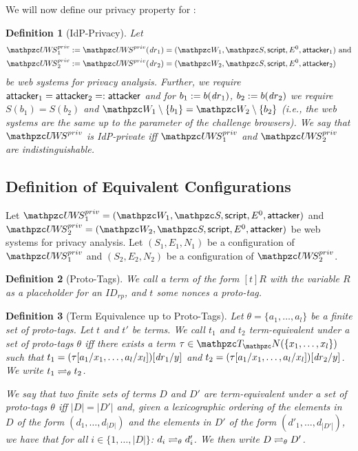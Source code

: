 \documentclass[letterpaper,onecolumn,10pt]{article}
\newtheorem{definition}{Definition}
\begin{document}
We will now define our privacy property for \uppresso:

\begin{definition}[IdP-Privacy]\label{def:idp-privacy}
  Let 
  \begin{align*}
    \uppressoprivwebsystem_1 := \uppressoprivwebsystem(\mi{dr}_1) =
    (\bidsystem_1, \scriptset, \mathsf{script}, E^0, \fAP{attacker}_1)&\text{ and}\\
    \uppressoprivwebsystem_2 := \uppressoprivwebsystem(\mi{dr}_2) =
    (\bidsystem_2, \scriptset, \mathsf{script}, E^0, \fAP{attacker}_2)&
  \end{align*}
  be \uppresso web systems for privacy analysis.  Further, we require
  $\mathsf{attacker}_1 = \mathsf{attacker}_2 =: \mathsf{attacker}$ and for $b_1
  := b(\mathit{dr}_1)$, $b_2 := b(\mathit{dr}_2)$ we require $S(b_1) = S(b_2)$
  and $\bidsystem_1 \setminus \{b_1\} = \bidsystem_2 \setminus
  \{b_2\}$ (i.e., the web systems are the same up to the parameter of
  the challenge browsers).  We say that $\uppressoprivwebsystem$ is
  \emph{IdP-private} iff $\uppressoprivwebsystem_1$ and
  $\uppressoprivwebsystem_2$ are indistinguishable.
\end{definition}

\subsection{Definition of Equivalent Configurations}\label{app:defin-equiv-stat}

Let $\uppressoprivwebsystem_1 = (\bidsystem_1, \scriptset, \mathsf{script}, E^0, \fAP{attacker})$ 
and $\uppressoprivwebsystem_2 = (\bidsystem_2, \scriptset, \mathsf{script}, E^0, \fAP{attacker})$ 
be \uppresso web systems for privacy analysis. Let $(S_1,E_1,N_1)$ 
be a configuration of $\uppressoprivwebsystem_1$ and $(S_2,E_2,N_2)$ 
be a configuration of $\uppressoprivwebsystem_2$.

\begin{definition}[Proto-Tags]
  We call a term of the form $[t]R$ with the variable
  $R$ as a placeholder for an $ID_{rp}$, and $t$ some nonces a
  \emph{proto-tag}.
\end{definition}

\begin{definition}[Term Equivalence up to Proto-Tags]
  Let $\theta = \{a_1, \ldots, a_l \}$ be a finite set of proto-tags.
  Let $t$ and $t'$ be terms. We call $t_1$ and $t_2$
  \emph{term-equivalent under a set of proto-tags $\theta$} iff there
  exists a term $\tau \in \terms(\{x_1,\dots,x_l\})$ such that
  $t_1 = (\tau [ a_1 / x_1 , \dots , a_l / x_l ])[ \mathit{dr}_1 / y ]$
  and
  $t_2 = (\tau [ a_1 / x_1 , \dots , a_l / x_l ])[ \mathit{dr}_2 / y ]$.
  We write $t_1 \rightleftharpoons_{\theta} t_2$.

  We say that two finite sets of terms $D$ and $D'$ are
  \emph{term-equivalent under a set of proto-tags $\theta$} iff
  $|D| = |D'|$ and, given a lexicographic ordering of the elements in
  $D$ of the form $(d_1,\dots,d_{|D|})$ and the elements in $D'$ of
  the form $(d'_1,\dots,d_{|D'|})$, we have that for all
  $i \in \{1,\dots,|D|\}$: $d_i \rightleftharpoons_{\theta} d'_i$. We then
  write $D \rightleftharpoons_{\theta} D'$.
\end{definition}
\end{document}
